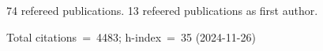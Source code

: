 74 refereed publications. 13 refeered publications as first author.

Total citations~=~4483; h-index~=~35 (2024-11-26)